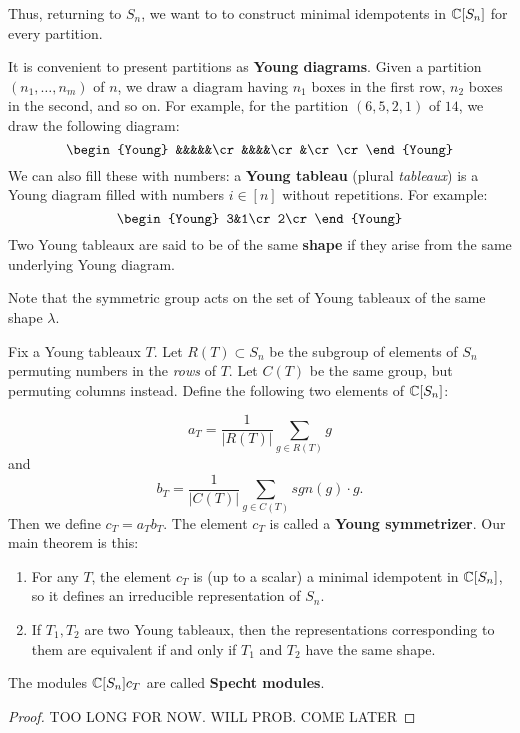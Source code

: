 \documentclass[11pt, english]{article}
\begin{document}
Thus, returning to $S_n$, we want to to construct minimal idempotents in $\mathbb{C}[S_n]$ for every partition.

It is convenient to present partitions as \textbf{Young diagrams}. Given a partition $(n_1,\ldots,n_m)$ of $n$, we draw a diagram having $n_1$ boxes in the first row, $n_2$ boxes in the second, and so on. For example, for the partition $(6,5,2,1)$ of $14$, we draw the following diagram:
$$
\begin{Young}
&&&&&\cr
&&&&\cr
&\cr
\cr
\end{Young}
$$
We can also fill these with numbers: a \textbf{Young tableau} (plural \emph{tableaux}) is a Young diagram filled with numbers $i \in [n]$ without repetitions. For example:
$$
\begin{Young}
3&1\cr
2\cr
\end{Young}
$$
Two Young tableaux are said to be of the same \textbf{shape} if they arise from the same underlying Young diagram.

Note that the symmetric group acts on the set of Young tableaux of the same shape $\lambda$. 

Fix a Young tableaux $T$. Let $R(T) \subset S_n$ be the subgroup of elements of $S_n$ permuting numbers in the \emph{rows} of $T$. Let $C(T)$ be the same group, but permuting columns instead. Define the following two elements of $\mathbb{C}[S_n]$:

$$
a_T = \frac{1}{\lvert R(T) \rvert} \sum_{g \in R(T)} g 
$$
and
$$
b_T = \frac{1}{\lvert C(T) \rvert} \sum_{g \in C(T)} sgn(g) \cdot g.
$$
Then we define $c_T=a_T b_T$. The element $c_T$ is called a \textbf{Young symmetrizer}. Our main theorem is this:

\begin{thm}
  \begin{enumerate}
  \item For any $T$, the element $c_T$ is (up to a scalar) a minimal idempotent in $\mathbb{C}[S_n]$, so it defines an irreducible representation of $S_n$.
\item If $T_1,T_2$ are two Young tableaux, then the representations corresponding to them are equivalent if and only if $T_1$ and $T_2$ have the same shape.
  \end{enumerate}
\end{thm}

The modules $\mathbb{C}[S_n]c_T$ are called \textbf{Specht modules}.

\begin{proof}
  TOO LONG FOR NOW. WILL PROB. COME LATER
\end{proof}
\end{document}
